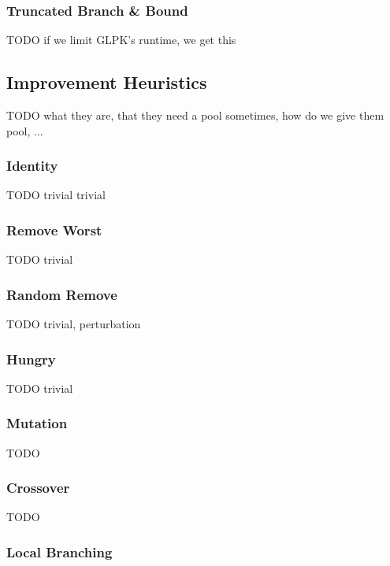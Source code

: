 \documentclass[a4paper,12pt,oneside]{report}
\begin{document}
\subsubsection{Truncated Branch \& Bound}

TODO if we limit GLPK's runtime, we get this 

\subsection{Improvement Heuristics}

TODO what they are, that they need a pool sometimes, how do we give them pool, ...

\subsubsection{Identity}

TODO trivial trivial

\subsubsection{Remove Worst}

TODO trivial

\subsubsection{Random Remove}

TODO trivial, perturbation

\subsubsection{Hungry}

TODO trivial

\subsubsection{Mutation}

TODO

\subsubsection{Crossover}

TODO

\subsubsection{Local Branching}
\end{document}
